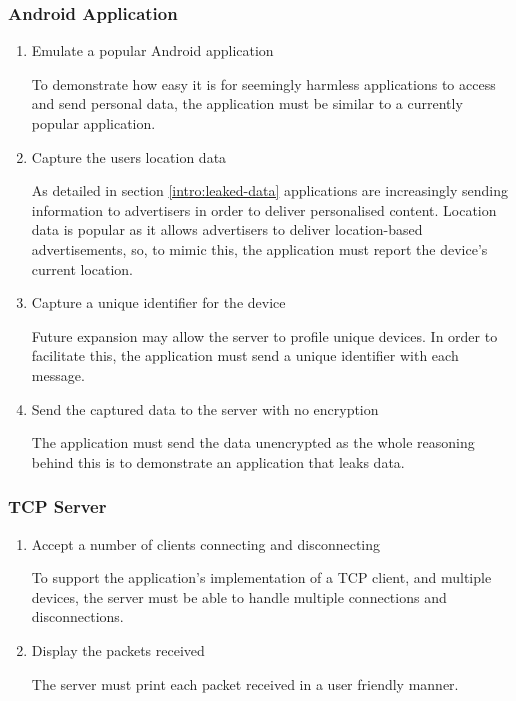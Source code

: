 \subsubsection{Android Application}
\begin{enumerate}
\item  Emulate a popular Android application

To demonstrate how easy it is for seemingly harmless applications to access and send personal data, the application must be similar to a currently popular application.

\item  Capture the users location data

As detailed in section \ref{intro:leaked-data} applications are increasingly sending information to advertisers in order to deliver personalised content. Location data is popular as it allows advertisers to deliver location-based advertisements, so, to mimic this, the application must report the device's current location. 

\item   Capture a unique identifier for the device

Future expansion may allow the server to profile unique devices. In order to facilitate this, the application must send a unique identifier with each message.

\item  Send the captured data to the server with no encryption

The application must send the data unencrypted as the whole reasoning behind this is to demonstrate an application that leaks data.
\end{enumerate}
\subsubsection{TCP Server}
\begin{enumerate}
\item Accept a number of clients connecting and disconnecting

To support the application's implementation of a TCP client, and multiple devices, the server must be able to handle multiple connections and disconnections.

\item Display the packets received

The server must print each packet received in a user friendly manner.
\end{enumerate}
\clearpage